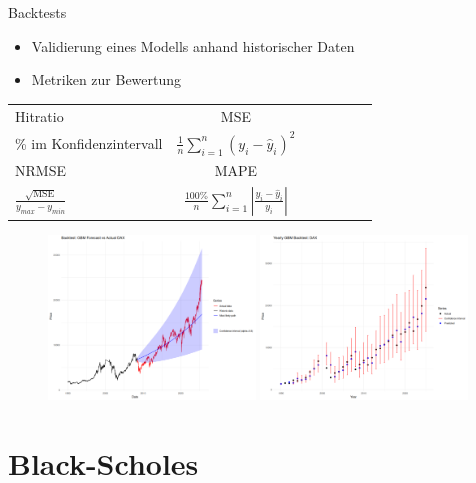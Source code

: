 \documentclass{beamer}
\begin{document}
\begin{frame}{Backtests}
  \begin{itemize}
      \item Validierung eines Modells anhand historischer Daten
      \item Metriken zur Bewertung
  
  \end{itemize}
\begin{table}[H]
\centering
\begin{tabular}{lcccccc}
Hitratio & MSE \\

\% im Konfidenzintervall & $\frac{1}{n} \sum_{i=1}^n (y_i - \hat{y}_i)^2$  \\
\hline
NRMSE & MAPE \\
$\frac{\sqrt{\text{MSE}}}{y_{max} - y_{min}}$ & $\frac{100\%}{n} \sum_{i=1}^n \left|\frac{y_i - \hat{y}_i}{y_i}\right|$ \\

\end{tabular}
\end{table}

  \begin{figure}
    \centering
  \includegraphics[width=0.49\textwidth]{../thesis/images/dax_backtest.png}
  \includegraphics[width=0.49\textwidth]{../thesis/images/dax_backtest_seq.png}
  \end{figure}
\end{frame}

\section{Black-Scholes}
\end{document}
